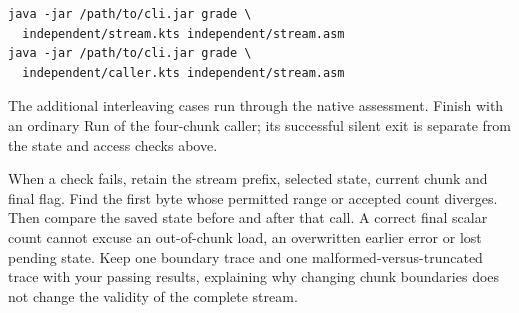 \noindent\begin{minipage}{\linewidth}
  \begin{verbatim}
java -jar /path/to/cli.jar grade \
  independent/stream.kts independent/stream.asm
java -jar /path/to/cli.jar grade \
  independent/caller.kts independent/stream.asm
\end{verbatim}
\end{minipage}

The additional interleaving cases run through the native assessment. Finish with
an ordinary Run of the four-chunk caller; its successful silent exit is separate
from the state and access checks above.


When a check fails, retain the stream prefix, selected state, current chunk and
final flag. Find the first byte whose permitted range or accepted count diverges.
Then compare the saved state before and after that call. A correct final scalar
count cannot excuse an out-of-chunk load, an overwritten earlier error or lost
pending state. Keep one boundary trace and one malformed-versus-truncated trace
with your passing results, explaining why changing chunk boundaries does not
change the validity of the complete stream.
